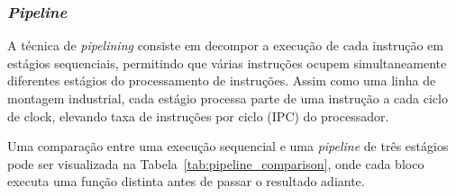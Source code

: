 \documentclass[
	12pt,				%
	openright,			%
	oneside,			%
	a4paper,			%
	english,			%
	french,				%
	spanish,			%
	brazil,				%
	]{abntex2}
\begin{document}
\subsubsection{\textit{Pipeline}}
\label{subsubsec:pipeline}

A técnica de \textit{pipelining} consiste em decompor a execução de cada instrução em estágios sequenciais, permitindo que várias instruções ocupem simultaneamente diferentes estágios do processamento de instruções. Assim como uma linha de montagem industrial, cada estágio processa parte de uma instrução a cada ciclo de clock, elevando taxa de instruções por ciclo (IPC) do processador\cite[p.47-51]{stallings_reduced_1988}.

Uma comparação entre uma execução sequencial e uma \textit{pipeline} de três estágios pode ser visualizada na Tabela~\ref{tab:pipeline_comparison}, onde cada bloco executa uma função distinta antes de passar o resultado adiante.
\end{document}
